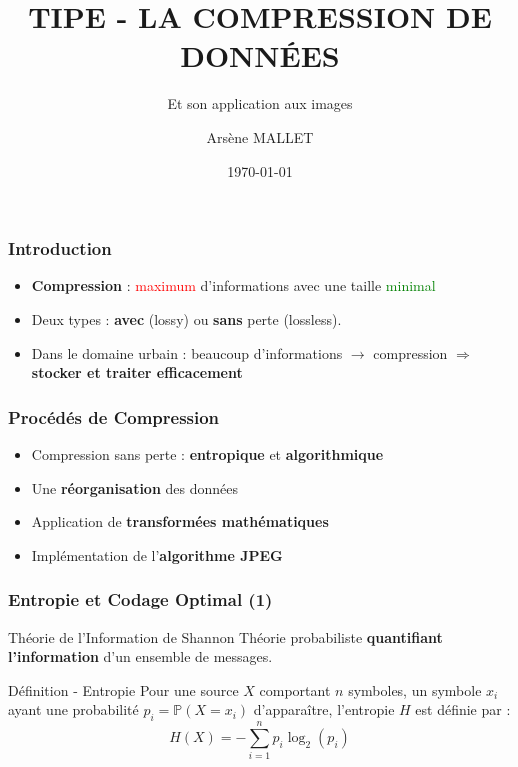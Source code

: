\documentclass[aspectratio=43]{beamer}
\title[Compression]{TIPE - LA COMPRESSION DE DONN\'EES}
\subtitle{Et son application aux images}
\author{Ars\`ene MALLET}
\date[\today]{\today}
\institute{Candidat - 14873}
\begin{document}
\begin{frame}
    \titlepage
\end{frame}

\begin{frame}
    \frametitle{Introduction}

    \begin{itemize}
        \setlength\itemsep{2em}
        \item \Large \textbf{Compression} : \textcolor{red}{maximum} d'informations avec une taille \textcolor{green}{minimal}
        \item Deux types : \textbf{avec} (lossy) ou \textbf{sans} perte (lossless).
        \item \large Dans le domaine urbain : beaucoup d'informations $\rightarrow$ compression $\Rightarrow$ \bfseries stocker et traiter efficacement
    \end{itemize}

\end{frame}

\begin{frame}
    \frametitle{Proc\'ed\'es de Compression}

    \begin{itemize}
        \Large
        \setlength\itemsep{2em}
        \item Compression sans perte : \textbf{entropique} et \textbf{algorithmique}
        \item Une \textbf{réorganisation} des données
        \item Application de \textbf{transformées mathématiques}
        \item Implémentation de l'\textbf{algorithme JPEG}
    \end{itemize}

\end{frame}

\begin{frame}
    \frametitle[allowframebreaks]{Entropie et Codage Optimal (1)}

    \begin{block}{Th\'eorie de l'Information de Shannon}
        Théorie probabiliste \textbf{quantifiant l’information} d’un ensemble de messages.
    \end{block}
    
    \vspace*{1em}

    \begin{alertblock}{Définition - Entropie}
        Pour une source $X$ comportant $n$ symboles, un symbole $x_i$ ayant
        une probabilité $p_i = \mathbb{P}(X = x_i)$ d’apparaître, l'entropie $H$ est définie par : 
        $$ H(X) = - \sum_{i = 1}^{n} p_i \log_2 (p_i) $$
    \end{alertblock}
\end{frame}
\end{document}
